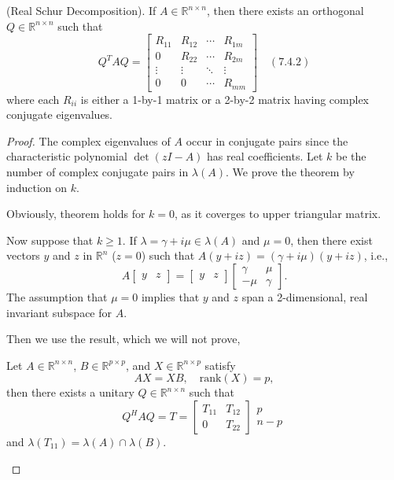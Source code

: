 \documentclass[journal]{IEEEtran}
\numberwithin{equation}{section}
\begin{document}
\begin{theorem}
(Real Schur Decomposition). If \(A \in \mathbb{R}^{n \times n}\), then there exists an orthogonal \(Q \in \mathbb{R}^{n \times n}\) such that
$$
Q^T A Q = \begin{bmatrix}
R_{11} & R_{12} & \cdots & R_{1m} \\
0 & R_{22} & \cdots & R_{2m} \\
\vdots & \vdots & \ddots & \vdots \\
0 & 0 & \cdots & R_{mm}
\end{bmatrix} \quad (7.4.2)
$$
where each \(R_{ii}\) is either a 1-by-1 matrix or a 2-by-2 matrix having complex conjugate eigenvalues.
\end{theorem}
\begin{proof}

The complex eigenvalues of \(A\) occur in conjugate pairs since the characteristic polynomial \(\det(zI - A)\) has real coefficients. Let \(k\) be the number of complex conjugate pairs in \(\lambda(A)\). We prove the theorem by induction on \(k\).  

Obviously, theorem holds for $k=0$, as it coverges to upper triangular matrix.

Now suppose that \(k \ge 1\). If \(\lambda = \gamma + i\mu \in \lambda(A)\) and \(\mu = 0\), then there exist vectors \(y\) and \(z\) in \(\mathbb{R}^n\) (\(z = 0\)) such that \(A(y + iz) = (\gamma + i\mu)(y + iz)\), i.e.,
$$
A \begin{bmatrix} y & z \end{bmatrix} = \begin{bmatrix} y & z \end{bmatrix} \begin{bmatrix} \gamma & \mu \\ -\mu & \gamma \end{bmatrix}.
$$
The assumption that \(\mu = 0\) implies that \(y\) and \(z\) span a 2-dimensional, real invariant subspace for \(A\). 

Then we use the result, which we will not prove,
\begin{lemma}
    Let \(A \in \mathbb{R}^{n \times n}\), \(B \in \mathbb{R}^{p \times p}\), and \(X \in \mathbb{R}^{n \times p}\) satisfy
$$AX = XB, \quad \text{rank}(X) = p, $$
then there exists a unitary \(Q \in \mathbb{R}^{n \times n}\) such that
$$
Q^H A Q = T = \begin{bmatrix} T_{11} & T_{12} \\ 0 & T_{22} \end{bmatrix} \begin{array}{c} p \\ n-p \end{array} 
$$
and \(\lambda(T_{11}) = \lambda(A) \cap \lambda(B)\).
\end{lemma}


\end{proof}
\end{document}
